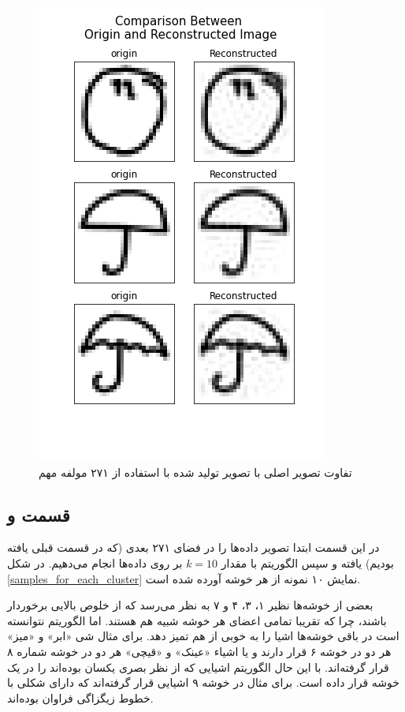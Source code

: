 \documentclass[12pt, a4paper]{article}
\begin{document}
\begin{figure}[h]
    \centering
    \includegraphics[width=0.5\linewidth]{images/q4/e/origin_and_reconstructed.png}
    \caption{تفاوت تصویر اصلی با تصویر تولید شده با استفاده از ۲۷۱ مولفه مهم}
    \label{origin_and_reconstructed_image}
\end{figure}

\subsection*{قسمت و}

در این قسمت ابتدا تصویر داده‌ها را در فضای ۲۷۱ بعدی (که در قسمت قبلی یافته بودیم)
یافته و سپس الگوریتم  با مقدار $k=10$ بر روی داده‌ها انجام می‌دهیم.
در شکل \ref{samples_for_each_cluster} نمایش ۱۰ نمونه از هر خوشه آورده شده است.

بعضی از خوشه‌ها نظیر ۱، ۳، ۴ و ۷ به نظر می‌رسد که از خلوص بالایی برخوردار باشند،
چرا که تقریبا تمامی اعضای هر خوشه شبیه هم هستند. اما الگوریتم
نتوانسته است در باقی خوشه‌ها اشیا را به خوبی از هم تمیز دهد. برای مثال شی
«ابر» و «میز» هر دو در خوشه ۶ قرار دارند و یا اشیاء «عینک» و «قیچی» هر دو در
خوشه شماره ۸ قرار گرفته‌اند. با این حال الگوریتم اشیایی که از نظر بصری
یکسان بوده‌اند را در یک خوشه قرار داده است. برای مثال در خوشه ۹ اشیایی قرار
گرفته‌اند که دارای شکلی با خطوط زیگزاگی فراوان بوده‌اند.
\end{document}
